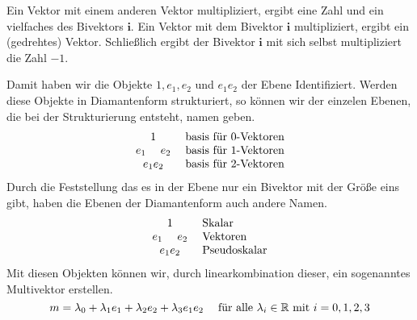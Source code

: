\documentclass[fleqn]{scrartcl}
\numberwithin{equation}{section}
\def\*#1{\mathbf{#1}}
\begin{document}
Ein Vektor mit einem anderen Vektor multipliziert, ergibt eine Zahl und ein
vielfaches des Bivektors $\*i$. Ein Vektor mit dem Bivektor $\*i$
multipliziert, ergibt ein (gedrehtes) Vektor. Schließlich ergibt der Bivektor
$\*i$ mit sich selbst multipliziert die Zahl $-1$.

Damit haben wir die Objekte $1, e_1, e_2$ und $e_1e_2$ der Ebene
Identifiziert. Werden diese Objekte in Diamantenform strukturiert, so können
wir der einzelen Ebenen, die bei der Strukturierung entsteht, namen geben.
\[
\begin{matrix}
    1 \\ 
    e_1\hspace{3ex} e_2 \\ 
    e_1e_2
\end{matrix}
\hspace{3ex}
\begin{matrix*}[l]
    \textrm{basis für }0\textrm{-Vektoren} \\ 
    \textrm{basis für }1\textrm{-Vektoren} \\ 
    \textrm{basis für }2\textrm{-Vektoren}
\end{matrix*}
\]
Durch die Feststellung das es in der Ebene nur ein Bivektor mit der Größe eins
gibt, haben die Ebenen der Diamantenform auch andere Namen.
\[
\begin{matrix}
    1 \\ 
    e_1\hspace{3ex} e_2 \\ 
    e_1e_2
\end{matrix}
\hspace{3ex}
\begin{matrix*}[l]
    \textrm{Skalar} \\ 
    \textrm{Vektoren} \\ 
    \textrm{Pseudoskalar}
\end{matrix*}
\]
Mit diesen Objekten können wir, durch linearkombination dieser, ein sogenanntes
Multivektor erstellen.
\[
    m = \lambda_0 + \lambda_1e_1 + \lambda_2e_2 +
    \lambda_3e_1e_2\hspace{3ex}\textrm{für alle
    }\lambda_i\in\mathbb{R}\textrm{ mit } i=0,1,2,3
\]
\end{document}
